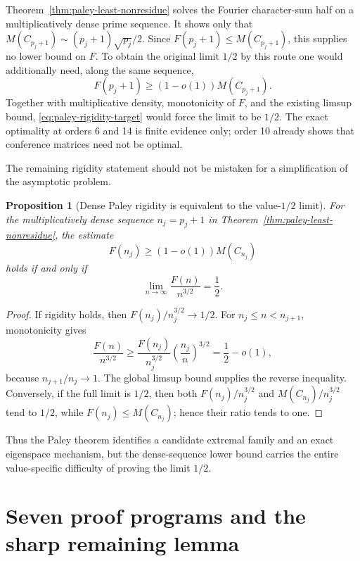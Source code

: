 \documentclass[11pt]{article}
\newtheorem{proposition}[theorem]{Proposition}
\begin{document}
Theorem~\ref{thm:paley-least-nonresidue} solves the Fourier character-sum half
on a multiplicatively dense prime sequence.  It shows only that
$M(C_{p_j+1})\sim(p_j+1)\sqrt{p_j}/2$.  Since
$F(p_j+1)\le M(C_{p_j+1})$, this supplies no lower bound on $F$.  To obtain
the original limit $1/2$ by this route one would additionally need, along the
same sequence,
\begin{equation}
 F(p_j+1)\ge(1-o(1))M(C_{p_j+1}).
 \label{eq:paley-rigidity-target}
\end{equation}
Together with multiplicative density, monotonicity of $F$, and the existing
limsup bound, \eqref{eq:paley-rigidity-target} would force the limit to be
$1/2$.  The exact
optimality at orders 6 and 14 is finite evidence only; order 10 already shows
that conference matrices need not be optimal.

The remaining rigidity statement should not be mistaken for a simplification
of the asymptotic problem.

\begin{proposition}[Dense Paley rigidity is equivalent to the value-$1/2$ limit]
\label{prop:paley-rigidity-equivalence}
For the multiplicatively dense sequence $n_j=p_j+1$ in
Theorem~\ref{thm:paley-least-nonresidue}, the estimate
\[
 F(n_j)\ge(1-o(1))M(C_{n_j})
\]
holds if and only if
\[
 \lim_{n\to\infty}\frac{F(n)}{n^{3/2}}=\frac12.
\]
\end{proposition}

\begin{proof}
If rigidity holds, then
$F(n_j)/n_j^{3/2}\to1/2$.  For $n_j\le n<n_{j+1}$, monotonicity gives
\[
 \frac{F(n)}{n^{3/2}}
 \ge\frac{F(n_j)}{n_j^{3/2}}\left(\frac{n_j}{n}\right)^{3/2}
 =\frac12-o(1),
\]
because $n_{j+1}/n_j\to1$.  The global limsup bound supplies the reverse
inequality.  Conversely, if the full limit is $1/2$, then both
$F(n_j)/n_j^{3/2}$ and $M(C_{n_j})/n_j^{3/2}$ tend to $1/2$, while
$F(n_j)\le M(C_{n_j})$; hence their ratio tends to one.
\end{proof}

Thus the Paley theorem identifies a candidate extremal family and an exact
eigenspace mechanism, but the dense-sequence lower bound carries the entire
value-specific difficulty of proving the limit $1/2$.

\section{Seven proof programs and the sharp remaining lemma}
\end{document}
